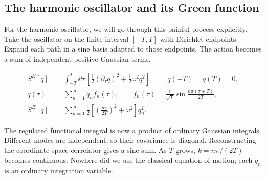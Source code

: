 \subsection{The harmonic oscillator and its Green function}

For the harmonic oscillator, we will go through this painful process explicitly. Take the oscillator on the finite interval $[-T,T]$ with Dirichlet endpoints. Expand each path in a sine basis adapted to those endpoints. The action becomes a sum of independent positive Gaussian terms.

\begin{align}
  S^E[q]&=\int_{-T}^{T}\dd\tau\,
  \left[\frac12(\partial_\tau q)^2+\frac12\omega^2q^2\right],
  \qquad q(-T)=q(T)=0,
  \label{eq:253a-ch02-oscillator-action}\\
  q(\tau)&=\sum_{n=1}^{\infty}q_nf_n(\tau),
  \qquad f_n(\tau)=\frac1{\sqrt T}\sin\frac{n\pi(\tau+T)}{2T},
  \label{eq:253a-ch02-dirichlet-modes}\\
  S^E[q]&=\sum_{n=1}^{\infty}
  \frac12\left[\left(\frac{n\pi}{2T}\right)^2+\omega^2\right]q_n^2.
  \label{eq:253a-ch02-diagonal-mode-action}
\end{align}

The regulated functional integral is now a product of ordinary Gaussian integrals. Different modes are independent, so their covariance is diagonal. Reconstructing the coordinate-space correlator gives a sine sum. As $T$ grows, $k=n\pi/(2T)$ becomes continuous. Nowhere did we use the classical equation of motion; each $q_n$ is an ordinary integration variable.

